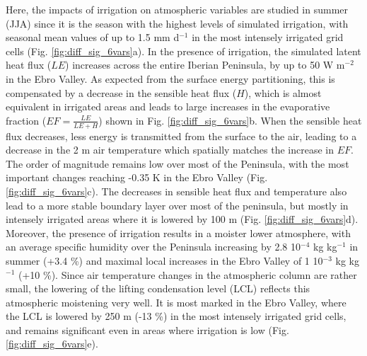 Here, the impacts of irrigation on atmospheric variables are studied in summer (JJA) since it is the season with the highest levels of simulated irrigation, with seasonal mean values of up to 1.5 mm d$^{-1}$ in the most intensely irrigated grid cells (Fig. \ref{fig:diff_sig_6vars}a).
In the presence of irrigation, the simulated latent heat flux ($LE$) increases across the entire Iberian Peninsula, by up to 50 W m$^{-2}$ in the Ebro Valley. As expected from the surface energy partitioning, this is compensated by a decrease in the sensible heat flux ($H$), which is almost equivalent in irrigated areas and leads to large increases in the evaporative fraction ($EF = \frac{LE}{LE+H}$) shown in Fig. \ref{fig:diff_sig_6vars}b.
When the sensible heat flux decreases, less energy is transmitted from the surface to the air, leading to a decrease in the 2 m air temperature which spatially matches the increase in $EF$. The order of magnitude remains low over most of the Peninsula, with the most important changes reaching -0.35 K in the Ebro Valley (Fig. \ref{fig:diff_sig_6vars}c).
The decreases in sensible heat flux and temperature also lead to a more stable boundary layer over most of the peninsula, but mostly in intensely irrigated areas where it is lowered by 100 m (Fig. \ref{fig:diff_sig_6vars}d).
Moreover, the presence of irrigation results in a moister lower atmosphere, with an average specific humidity over the Peninsula increasing by 2.8 10$^{-4}$ kg kg$^{-1}$ in summer (+3.4 \%) and maximal local increases in the Ebro Valley of 1 10$^{-3}$ kg kg$^{-1}$ (+10 \%). Since air temperature changes in the atmospheric column are rather small, the lowering of the lifting condensation level (LCL) reflects this atmospheric moistening very well. It is most marked in the Ebro Valley, where the LCL is lowered by 250 m (-13 \%) in the most intensely irrigated grid cells, and remains significant even in areas where irrigation is low (Fig. \ref{fig:diff_sig_6vars}e).

